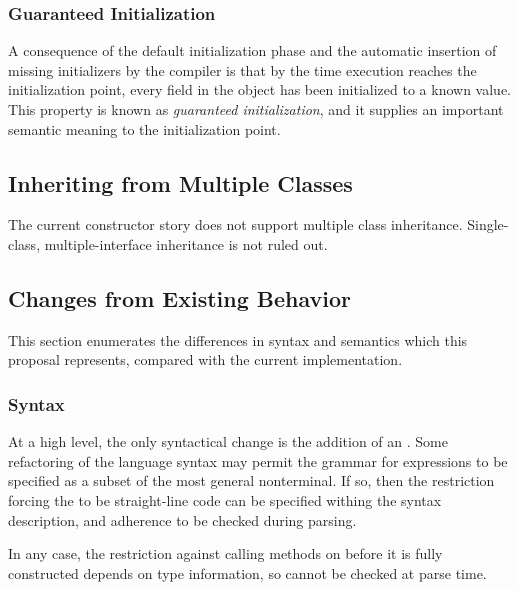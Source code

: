 \subsubsection{Guaranteed Initialization}
\label{Guaranteed_Initialization}

A consequence of the default initialization phase and the automatic insertion of
missing initializers by the compiler is that by the time execution reaches the
initialization point, every field in the object has been initialized to a known
value.  This property is known as \emph{guaranteed initialization}, and it supplies an
important semantic meaning to the initialization point.

\subsection{Inheriting from Multiple Classes}
\label{Inheriting_from_Multiple_Classes}

The current constructor story does not support multiple class inheritance.
Single-class, multiple-interface inheritance is not ruled out.

\subsection{Changes from Existing Behavior}

This section enumerates the differences in syntax and semantics which this
proposal represents, compared with the current implementation.

\subsubsection{Syntax}

At a high level, the only syntactical change is the addition of
an .  Some refactoring of the language syntax may
permit the grammar for  expressions to be specified as
a subset of the most general  nonterminal.  If so, then the
restriction forcing the  to be straight-line code
can be specified withing the syntax description, and adherence to be checked
during parsing.

In any case, the restriction against calling methods on  before it is
fully constructed depends on type information, so cannot be checked at parse
time.

